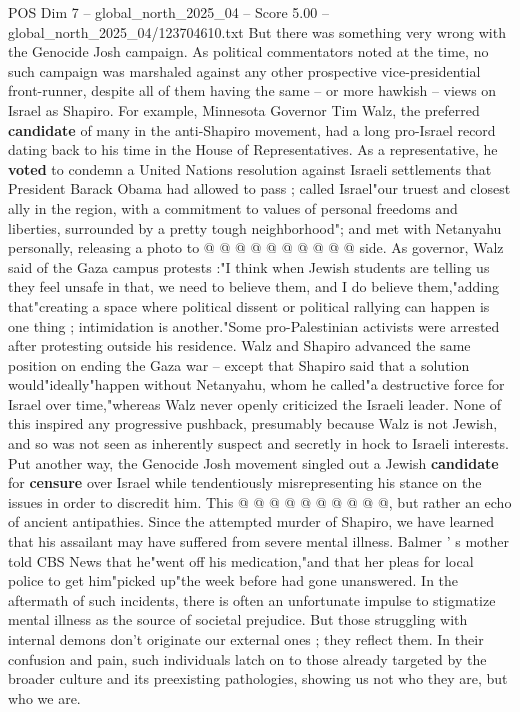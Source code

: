 \begin{textsample}{POS Dim 7 – global\_north\_2025\_04 – Score 5.00 – global\_north\_2025\_04/123704610.txt}
But there was something very wrong with the Genocide Josh campaign.
As political commentators noted at the time, no such campaign was marshaled against any other prospective vice-presidential front-runner, despite all of them having the same -- or more hawkish -- views on Israel as Shapiro.
For example, Minnesota Governor Tim Walz, the preferred \textbf{candidate} of many in the anti-Shapiro movement, had a long pro-Israel record dating back to his time in the House of Representatives.
As a representative, he \textbf{voted} to condemn a United Nations resolution against Israeli settlements that President Barack Obama had allowed to pass ; called Israel"our truest and closest ally in the region, with a commitment to values of personal freedoms and liberties, surrounded by a pretty tough neighborhood"; and met with Netanyahu personally, releasing a photo to @ @ @ @ @ @ @ @ @ @ side.
As governor, Walz said of the Gaza campus protests :"I think when Jewish students are telling us they feel unsafe in that, we need to believe them, and I do believe them,"adding that"creating a space where political dissent or political rallying can happen is one thing ; intimidation is another."Some pro-Palestinian activists were arrested after protesting outside his residence.
Walz and Shapiro advanced the same position on ending the Gaza war -- except that Shapiro said that a solution would"ideally"happen without Netanyahu, whom he called"a destructive force for Israel over time,"whereas Walz never openly criticized the Israeli leader.
None of this inspired any progressive pushback, presumably because Walz is not Jewish, and so was not seen as inherently suspect and secretly in hock to Israeli interests.
Put another way, the Genocide Josh movement singled out a Jewish \textbf{candidate} for \textbf{censure} over Israel while tendentiously misrepresenting his stance on the issues in order to discredit him.
This @ @ @ @ @ @ @ @ @ @, but rather an echo of ancient antipathies.
Since the attempted murder of Shapiro, we have learned that his assailant may have suffered from severe mental illness.
Balmer ' s mother told CBS News that he"went off his medication,"and that her pleas for local police to get him"picked up"the week before had gone unanswered.
In the aftermath of such incidents, there is often an unfortunate impulse to stigmatize mental illness as the source of societal prejudice.
But those struggling with internal demons don't originate our external ones ; they reflect them.
In their confusion and pain, such individuals latch on to those already targeted by the broader culture and its preexisting pathologies, showing us not who they are, but who we are.

\end{textsample}
